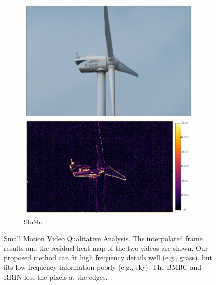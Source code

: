 \documentclass{article}
\begin{document}
\begin{figure}[h]
\begin{subfigure}{0.125\textwidth}
    \includegraphics[width=1\linewidth]{qua_imgs/TEST02_045_f0465_super.jpg}
    \caption{SloMo}
\end{subfigure}
\caption{Small Motion Video Qualitative Analysis. The interpolated frame results and the residual heat map of the two videos are shown. Our proposed method can fit high frequency details well (e.g., grass), but fits low frequency information poorly (e.g., sky). The BMBC and RRIN lose the pixels at the edges.}
\end{figure}
\end{document}
